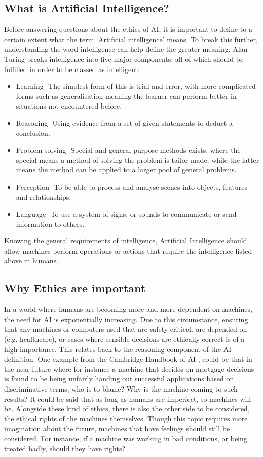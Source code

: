 \documentclass[article]{IEEEtran}
\begin{document}
\subsection{What is Artificial Intelligence?}
Before answering questions about the ethics of AI, it is important to define to a certain extent what the term ‘Artificial intelligence’ means. To break this further, understanding the word intelligence can help define the greater meaning. Alan Turing \cite{Alan Turing website} breaks intelligence into five major components, all of which should be fulfilled in order to be classed as intelligent:
\begin{itemize}
\item Learning- The simplest form of this is trial and error, with more complicated forms such as generalisation meaning the learner can perform better in situations not encountered before.
\item Reasoning- Using evidence from a set of given statements to deduct a conclusion.
\item Problem solving- Special and general-purpose methods exists, where the special means a method of solving the problem is tailor made, while the latter means the method can be applied to a larger pool of general problems.	
\item Perception- To be able to process and analyse scenes into objects, features and relationships.
\item Language- To use a system of signs, or sounds to communicate or send information to others. 
\end{itemize}
Knowing the general requirements of intelligence, Artificial Intelligence should allow machines perform operations or actions that require the intelligence listed above in humans.

\subsection{Why Ethics are important}
In a world where humans are becoming more and more dependent on machines, the need for AI is exponentially increasing. Due to this circumstance, ensuring that any machines or computers used that are safety critical, are depended on (e.g. healthcare), or cases where sensible decisions are ethically correct is of a high importance. This relates back to the reasoning component of the AI definition. One example from the Cambridge Handbook of AI \cite{ethics important}, could be that in the near future where for instance a machine that decides  on mortgage decisions is found to be being unfairly handing out successful applications based on discriminative terms, who is to blame? Why is the machine coming to such results? It could be said that as long as humans are imperfect, so machines will be. 
Alongside these kind of ethics, there is also the other side to be considered, the ethical rights of the machines themselves. Though this topic requires more imagination about the future, machines that have feelings should still be considered. For instance, if a machine was working in bad conditions, or being treated badly, should they have rights?  
\end{document}
